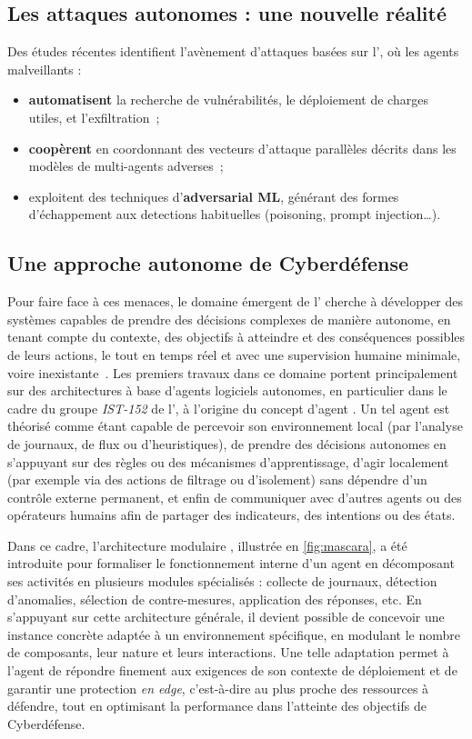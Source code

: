 \subsection*{Les attaques autonomes : une nouvelle réalité}

Des études récentes identifient l'avènement d'attaques basées sur l', où les agents malveillants :
\begin{itemize}
    \item \textbf{automatisent} la recherche de vulnérabilités, le déploiement de charges utiles, et l'exfiltration~\cite{AutoAttacker2024};
    \item \textbf{coopèrent} en coordonnant des vecteurs d'attaque parallèles décrits dans les modèles de multi-agents adverses~\cite{Falong2025};
    \item exploitent des techniques d'\textbf{adversarial ML}, générant des formes d'échappement aux detections habituelles (poisoning, prompt injection…).
\end{itemize}

\subsection*{Une approche autonome de Cyberdéfense}

Pour faire face à ces menaces, le domaine émergent de l' cherche à développer des systèmes capables de prendre des décisions complexes de manière autonome, en tenant compte du contexte, des objectifs à atteindre et des conséquences possibles de leurs actions, le tout en temps réel et avec une supervision humaine minimale, voire inexistante~\cite{Vyas2023}. Les premiers travaux dans ce domaine portent principalement sur des architectures à base d'agents logiciels autonomes, en particulier dans le cadre du groupe \textit{IST-152} de l', à l'origine du concept d'agent .
Un tel agent est théorisé comme étant capable de percevoir son environnement local (par l'analyse de journaux, de flux ou d'heuristiques), de prendre des décisions autonomes en s'appuyant sur des règles ou des mécanismes d'apprentissage, d'agir localement (par exemple via des actions de filtrage ou d'isolement) sans dépendre d'un contrôle externe permanent, et enfin de communiquer avec d'autres agents ou des opérateurs humains afin de partager des indicateurs, des intentions ou des états.

Dans ce cadre, l'architecture modulaire , illustrée en \autoref{fig:mascara}, a été introduite pour formaliser le fonctionnement interne d'un agent  en décomposant ses activités en plusieurs modules spécialisés : collecte de journaux, détection d'anomalies, sélection de contre-mesures, application des réponses, etc. En s'appuyant sur cette architecture générale, il devient possible de concevoir une instance concrète adaptée à un environnement spécifique, en modulant le nombre de composants, leur nature et leurs interactions. Une telle adaptation permet à l'agent  de répondre finement aux exigences de son contexte de déploiement et de garantir une protection {\em en edge}, c'est-à-dire au plus proche des ressources à défendre, tout en optimisant la performance dans l'atteinte des objectifs de Cyberdéfense.

